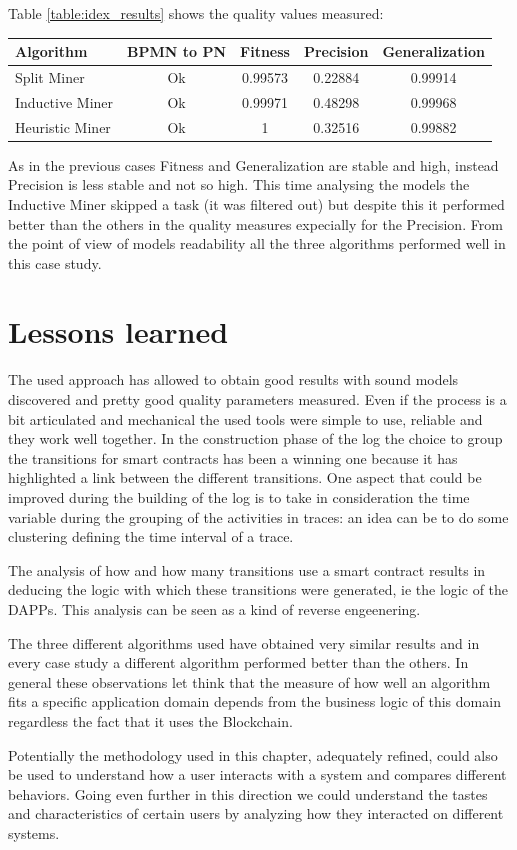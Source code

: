Table \ref{table:idex_results} shows the quality values measured:

\begin{center}
    \begin{tabular}{ | l | c | c | c | c |}
        \hline
        \textbf{Algorithm} & \textbf{BPMN to PN} & \textbf{Fitness} & \textbf{Precision} & \textbf{Generalization} \\ 
        \hline
        Split Miner & Ok & 0.99573 & 0.22884 & 0.99914 \\ 
        \hline
        Inductive Miner & Ok & 0.99971 & 0.48298 & 0.99968 \\
        \hline
        Heuristic Miner & Ok & 1 & 0.32516 & 0.99882 \\
        \hline
    \end{tabular}
    \label{table:idex_results}
\end{center}

As in the previous cases Fitness and Generalization are stable and high, instead Precision is less stable and not so high.
This time analysing the models the Inductive Miner skipped a task (it was filtered out) but despite this it performed 
better than the others in the quality measures expecially for the Precision. From the point of view of models readability all 
the three algorithms performed well in this case study.


\section{Lessons learned}
The used approach has allowed to obtain good results with sound models discovered and pretty good quality parameters 
measured. Even if the process is a bit articulated and mechanical the used tools were simple to use, reliable and 
they work well together.
In the construction phase of the log the choice to group the transitions for smart contracts has been a winning one 
because it has highlighted a link between the different transitions. One aspect that could be improved during the building of 
the log is to take in consideration the time variable during the grouping of the activities in traces: an idea can be to do 
some clustering defining the time interval of a trace.

The analysis of how and how many transitions use a smart contract results in deducing the logic with which these transitions 
were generated, ie the logic of the DAPPs. This analysis can be seen as a kind of reverse engeenering. 

The three different algorithms used have obtained very similar results and in every case study a different algorithm performed 
better than the others. In general these observations let think that the measure of how well an algorithm fits a specific 
application domain depends from the business logic of this domain regardless the fact that it uses the Blockchain.

Potentially the methodology used in this chapter, adequately refined, could also be used to understand how a user interacts with 
a system and compares different behaviors. Going even further in this direction we could understand the tastes and 
characteristics of certain users by analyzing how they interacted on different systems.